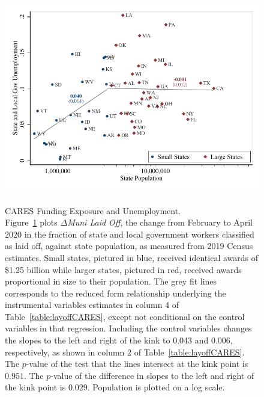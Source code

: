 \begin{singlespace}
\begin{center}
\begin{figure}[!ht]
	\centering
	\includegraphics[scale=1.1]{../output/figures/cares_logpop_rf_no_controls.pdf}
	\vspace{-1.2cm}
	\caption{\\ CARES Funding Exposure and Unemployment. \\
	{\small Figure~\ref{figure:cares_reducedform} plots $\Delta$\emph{Muni Laid Off}, the change from February to April 2020 in the fraction of state and local government workers classified as laid off, against state population, as measured from 2019 Census estimates. Small states, pictured in blue, received identical awards of \$1.25 billion while larger states, pictured in red, received awards proportional in size to their population. The grey fit lines corresponds to the reduced form relationship underlying the instrumental variables estimates in column 4 of Table~\ref{table:layoffCARES}, except not conditional on the control variables in that regression. Including the control variables changes the slopes to the left and right of the kink to 0.043 and 0.006, respectively, as shown in column 2 of Table~\ref{table:layoffCARES}. The $p$-value of the test that the lines intersect at the kink point is $0.951$. The $p$-value of the difference in slopes to the left and right of the kink point is $0.029$. Population is plotted on a log scale.}}
	\label{figure:cares_reducedform}
\end{figure}
\end{center}
\end{singlespace}

